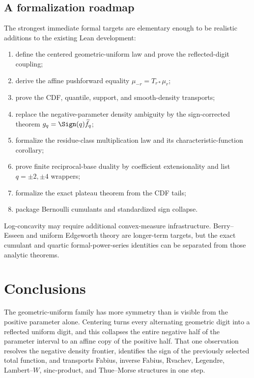\documentclass[11pt]{article}
\theoremstyle{definition}
\begin{document}
\subsection{A formalization roadmap}

The strongest immediate formal targets are elementary enough to be realistic additions
to the existing Lean development:

\begin{enumerate}[leftmargin=2.2em]
\item define the centered geometric-uniform law and prove the reflected-digit coupling;
\item derive the affine pushforward equality
      \(\mu_{-r}=T_{r*}\mu_r\);
\item prove the CDF, quantile, support, and smooth-density transports;
\item replace the negative-parameter density ambiguity by the sign-corrected theorem
      \(g_q=\Sign(q)\widetilde f_q\);
\item formalize the residue-class multiplication law and its characteristic-function
      corollary;
\item prove finite reciprocal-base duality by coefficient extensionality and list
      \(q=\pm2,\pm4\) wrappers;
\item formalize the exact plateau theorem from the CDF tails;
\item package Bernoulli cumulants and standardized sign collapse.
\end{enumerate}

Log-concavity may require additional convex-measure infrastructure.  Berry--Esseen and
uniform Edgeworth theory are longer-term targets, but the exact cumulant and quartic
formal-power-series identities can be separated from those analytic theorems.

\section{Conclusions}

The geometric-uniform family has more symmetry than is visible from the positive
parameter alone.  Centering turns every alternating geometric digit into a reflected
uniform digit, and this collapses the entire negative half of the parameter interval to
an affine copy of the positive half.  That one observation resolves the negative density
frontier, identifies the sign of the previously selected total function, and transports
Fabius, inverse Fabius, Rvachev, Legendre, Lambert--\(W\), sinc-product, and Thue--Morse
structures in one step.
\end{document}
